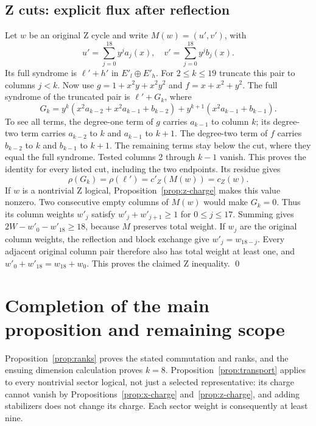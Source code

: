 \documentclass{article}
\begin{document}
\subsection{Z cuts: explicit flux after reflection}\label{sec:z-cuts}

Let \(w\) be an original Z cycle and write \(M(w) = (u', v')\), with
\begin{equation}
  u' = \sum_{j=0}^{18} y^j a_j(x), \quad
  v' = \sum_{j=0}^{18} y^j b_j(x).
\end{equation}
Its full syndrome is \(\ell' + h'\) in \(E'_l \oplus E'_h\). For \(2 \le k \le 19\) truncate
this pair to columns \(j < k\). Now use \(g = 1 + x^2 y + x^2 y^2\) and
\(f = x + x^2 + y^2\). The full syndrome of the truncated pair is \(\ell' + G_k\), where
\begin{equation}
  G_k = y^k (x^2 a_{k-2} + x^2 a_{k-1} + b_{k-2})
  + y^{k+1} (x^2 a_{k-1} + b_{k-1}).
\end{equation}
To see all terms, the degree-one term of \(g\) carries \(a_{k-1}\) to column \(k\); its
degree-two term carries \(a_{k-2}\) to \(k\) and \(a_{k-1}\) to \(k + 1\). The degree-two
term of \(f\) carries \(b_{k-2}\) to \(k\) and \(b_{k-1}\) to \(k + 1\). The remaining terms
stay below the cut, where they equal the full syndrome. Tested columns 2 through \(k - 1\)
vanish. This proves the identity for every listed cut, including the two endpoints. Its
residue gives
\begin{equation}
  \rho(G_k) = \rho(\ell') = c'_Z(M(w)) = c_Z(w).
\end{equation}
If \(w\) is a nontrivial Z logical, Proposition~\ref{prop:z-charge} makes this value nonzero. Two
consecutive empty columns of \(M(w)\) would make \(G_k = 0\). Thus its column weights
\(w'_j\) satisfy \(w'_j + w'_{j+1} \ge 1\) for \(0 \le j \le 17\). Summing gives
\(2W - w'_0 - w'_{18} \ge 18\), because \(M\) preserves total weight. If \(w_j\) are the
original column weights, the reflection and block exchange give \(w'_j = w_{18-j}\). Every
adjacent original column pair therefore also has total weight at least one, and
\(w'_0 + w'_{18} = w_{18} + w_0\). This proves the claimed Z inequality. \qed

\section{Completion of the main proposition and remaining scope}\label{sec:completion}

Proposition~\ref{prop:ranks} proves the stated commutation and ranks, and the ensuing dimension
calculation proves \(k = 8\). Proposition~\ref{prop:transport} applies to every nontrivial sector
logical, not just a selected representative: its charge cannot vanish by
Propositions~\ref{prop:x-charge} and~\ref{prop:z-charge}, and adding stabilizers does not change
its charge. Each sector weight is consequently at least nine.
\end{document}
